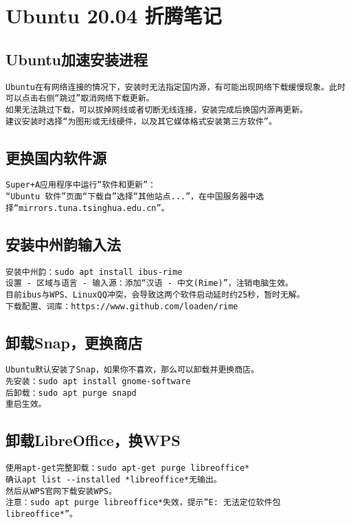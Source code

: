 \documentclass[a4paper,fontset=fandol,zihao=-4,linespread=1.2]{ctexbook}
\begin{document}
\chapter{Ubuntu 20.04 折腾笔记}

\section{Ubuntu加速安装进程}
\begin{lstlisting}
Ubuntu在有网络连接的情况下，安装时无法指定国内源，有可能出现网络下载缓慢现象。此时可以点击右侧“跳过”取消网络下载更新。
如果无法跳过下载，可以拔掉网线或者切断无线连接，安装完成后换国内源再更新。
建议安装时选择“为图形或无线硬件，以及其它媒体格式安装第三方软件”。
\end{lstlisting}

\section{更换国内软件源}
\begin{lstlisting}
Super+A应用程序中运行“软件和更新”：
“Ubuntu 软件”页面“下载自”选择“其他站点...”，在中国服务器中选择“mirrors.tuna.tsinghua.edu.cn”。
\end{lstlisting}

\section{安装中州韵输入法}
\begin{lstlisting}
安装中州韵：sudo apt install ibus-rime
设置 - 区域与语言 - 输入源：添加“汉语 - 中文(Rime)”，注销电脑生效。
目前ibus与WPS、LinuxQQ冲突，会导致这两个软件启动延时约25秒，暂时无解。
下载配置、词库：https://www.github.com/loaden/rime
\end{lstlisting}

\section{卸载Snap，更换商店}
\begin{lstlisting}
Ubuntu默认安装了Snap，如果你不喜欢，那么可以卸载并更换商店。
先安装：sudo apt install gnome-software
后卸载：sudo apt purge snapd
重启生效。
\end{lstlisting}

\section{卸载LibreOffice，换WPS}
\begin{lstlisting}
使用apt-get完整卸载：sudo apt-get purge libreoffice*
确认apt list --installed *libreoffice*无输出。
然后从WPS官网下载安装WPS。
注意：sudo apt purge libreoffice*失效，提示“E: 无法定位软件包 libreoffice*”。
\end{lstlisting}
\end{document}
